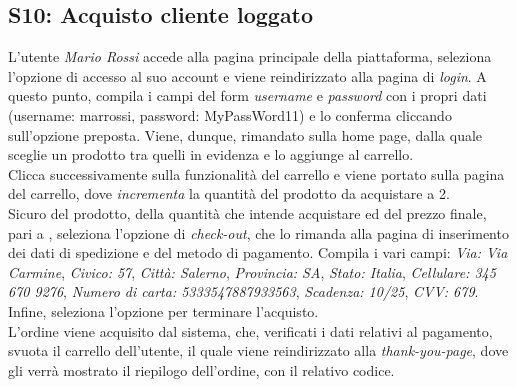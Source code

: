 \documentclass[12pt, a4paper, oneside]{book}
\begin{document}
    \subsection*{S10: Acquisto cliente loggato}
        L'utente \textit{Mario Rossi} accede alla pagina principale della piattaforma, seleziona l'opzione di accesso al suo account e viene reindirizzato alla pagina di \textit{login}.
        A questo punto, compila i campi del form \textit{username} e \textit{password} con i propri dati (username: marrossi, password: MyPassWord11) e lo conferma cliccando sull'opzione preposta.
        Viene, dunque, rimandato sulla home page, dalla quale sceglie un prodotto tra quelli in evidenza e lo aggiunge al carrello.\\
        Clicca successivamente sulla funzionalità del carrello e viene portato sulla pagina del carrello, dove \textit{incrementa} la quantità del prodotto da acquistare a 2.\\
        Sicuro del prodotto, della quantità che intende acquistare ed del prezzo finale, pari a , seleziona l'opzione di \textit{check-out}, che lo rimanda
        alla pagina di inserimento dei dati di spedizione e del metodo di pagamento. Compila i vari campi: \textit{Via: Via Carmine}, \textit{Civico: 57}, \textit{Città: Salerno}, \textit{Provincia: SA}, \textit{Stato: Italia}, \textit{Cellulare: 345 670 9276}, \textit{Numero di carta: 5333547887933563}, \textit{Scadenza: 10/25}, \textit{CVV: 679}. Infine, seleziona l'opzione per terminare l'acquisto.\\
        L'ordine viene acquisito dal sistema, che, verificati i dati relativi al pagamento, svuota il carrello dell'utente, il quale viene reindirizzato alla
        \textit{thank-you-page}, dove gli verrà mostrato il riepilogo dell'ordine, con il relativo codice.
\end{document}

